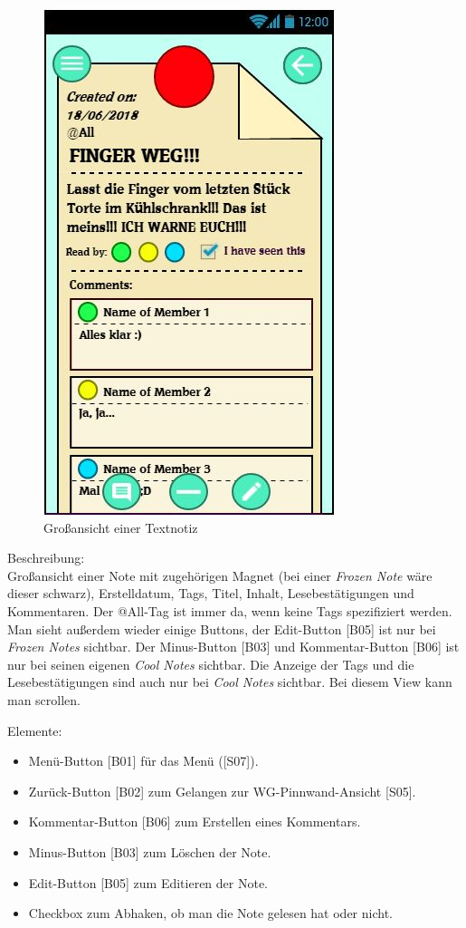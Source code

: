 \documentclass[a4paper]{scrreprt}
\begin{document}
    	\begin{figure}
    		
    		\caption{Großansicht einer Textnotiz}
    		\includegraphics{fridget_notebig.JPG}
    	
    	\end{figure}
    	
    	
    	
    	Beschreibung: \\
    	Großansicht einer Note mit zugehörigen Magnet  (bei einer \textit{Frozen Note} wäre dieser schwarz), Erstelldatum, Tags, Titel, Inhalt, Lesebestätigungen und Kommentaren. Der @All-Tag ist immer da, wenn keine Tags spezifiziert werden. Man sieht außerdem wieder einige Buttons, der Edit-Button {[}B05{]} ist nur bei \textit{Frozen Notes} sichtbar. Der Minus-Button {[}B03{]}  und Kommentar-Button {[}B06{]} ist nur bei seinen eigenen \textit{Cool Notes} sichtbar. Die Anzeige der Tags und die Lesebestätigungen sind auch nur bei \textit{Cool Notes} sichtbar. Bei diesem View kann man scrollen.
    	
    	
    	\hfill
    	Elemente:
    	\begin{itemize}
    		\renewcommand\labelitemi{--}
    		\item  Menü-Button {[}B01{]} für das Menü ({[}S07{]}).
    		\item Zurück-Button {[}B02{]} zum Gelangen zur
    		WG-Pinnwand-Ansicht {[}S05{]}.
    		\item Kommentar-Button {[}B06{]} zum Erstellen eines
    		Kommentars.
    		\item Minus-Button {[}B03{]} zum Löschen der Note.
    		\item Edit-Button {[}B05{]} zum Editieren der Note.
    		\item Checkbox zum Abhaken, ob man die Note gelesen hat oder nicht.
    		
    	\end{itemize}
    	
\end{document}
